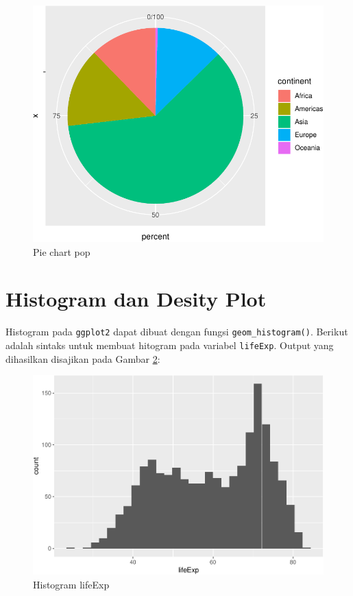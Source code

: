 \documentclass[]{book}
\newenvironment{Shaded}{\begin{snugshade}}{\end{snugshade}}
\newcommand{\KeywordTok}[1]{\textcolor[rgb]{0.13,0.29,0.53}{\textbf{#1}}}
\newcommand{\StringTok}[1]{\textcolor[rgb]{0.31,0.60,0.02}{#1}}
\newcommand{\OperatorTok}[1]{\textcolor[rgb]{0.81,0.36,0.00}{\textbf{#1}}}
\newcommand{\NormalTok}[1]{#1}
\begin{document}
\begin{figure}

{\centering \includegraphics[width=0.7\linewidth]{EnvStat_files/figure-latex/ggpie-1} 

}

\caption{Pie chart pop}\label{fig:ggpie}
\end{figure}

\section{Histogram dan Desity Plot}\label{histogram-dan-desity-plot}

Histogram pada \texttt{ggplot2} dapat dibuat dengan fungsi
\texttt{geom\_histogram()}. Berikut adalah sintaks untuk membuat
hitogram pada variabel \texttt{lifeExp}. Output yang dihasilkan
disajikan pada Gambar \ref{fig:gghist}:

\begin{Shaded}
\end{Shaded}

\begin{figure}

{\centering \includegraphics[width=0.7\linewidth]{EnvStat_files/figure-latex/gghist-1} 

}

\caption{Histogram lifeExp }\label{fig:gghist}
\end{figure}
\end{document}
